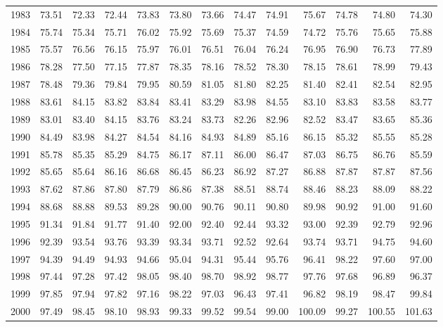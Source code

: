 \begin{longtable}{rrrrrrrrrrrrr}
  1983 & 73.51 & 72.33 & 72.44 & 73.83 & 73.80 & 73.66 & 74.47 & 74.91 & 75.67 & 74.78 & 74.80 & 74.30 \\ 
  1984 & 75.74 & 75.34 & 75.71 & 76.02 & 75.92 & 75.69 & 75.37 & 74.59 & 74.72 & 75.76 & 75.65 & 75.88 \\ 
  1985 & 75.57 & 76.56 & 76.15 & 75.97 & 76.01 & 76.51 & 76.04 & 76.24 & 76.95 & 76.90 & 76.73 & 77.89 \\ 
  1986 & 78.28 & 77.50 & 77.15 & 77.87 & 78.35 & 78.16 & 78.52 & 78.30 & 78.15 & 78.61 & 78.99 & 79.43 \\ 
  1987 & 78.48 & 79.36 & 79.84 & 79.95 & 80.59 & 81.05 & 81.80 & 82.25 & 81.40 & 82.41 & 82.54 & 82.95 \\ 
  1988 & 83.61 & 84.15 & 83.82 & 83.84 & 83.41 & 83.29 & 83.98 & 84.55 & 83.10 & 83.83 & 83.58 & 83.77 \\ 
  1989 & 83.01 & 83.40 & 84.15 & 83.76 & 83.24 & 83.73 & 82.26 & 82.96 & 82.52 & 83.47 & 83.65 & 85.36 \\ 
  1990 & 84.49 & 83.98 & 84.27 & 84.54 & 84.16 & 84.93 & 84.89 & 85.16 & 86.15 & 85.32 & 85.55 & 85.28 \\ 
  1991 & 85.78 & 85.35 & 85.29 & 84.75 & 86.17 & 87.11 & 86.00 & 86.47 & 87.03 & 86.75 & 86.76 & 85.59 \\ 
  1992 & 85.65 & 85.64 & 86.16 & 86.68 & 86.45 & 86.23 & 86.92 & 87.27 & 86.88 & 87.87 & 87.87 & 87.56 \\ 
  1993 & 87.62 & 87.86 & 87.80 & 87.79 & 86.86 & 87.38 & 88.51 & 88.74 & 88.46 & 88.23 & 88.09 & 88.22 \\ 
  1994 & 88.68 & 88.88 & 89.53 & 89.28 & 90.00 & 90.76 & 90.11 & 90.80 & 89.98 & 90.92 & 91.00 & 91.60 \\ 
  1995 & 91.34 & 91.84 & 91.77 & 91.40 & 92.00 & 92.40 & 92.44 & 93.32 & 93.00 & 92.39 & 92.79 & 92.96 \\ 
  1996 & 92.39 & 93.54 & 93.76 & 93.39 & 93.34 & 93.71 & 92.52 & 92.64 & 93.74 & 93.71 & 94.75 & 94.60 \\ 
  1997 & 94.39 & 94.49 & 94.93 & 94.66 & 95.04 & 94.31 & 95.44 & 95.76 & 96.41 & 98.22 & 97.60 & 97.00 \\ 
  1998 & 97.44 & 97.28 & 97.42 & 98.05 & 98.40 & 98.70 & 98.92 & 98.77 & 97.76 & 97.68 & 96.89 & 96.37 \\ 
  1999 & 97.85 & 97.94 & 97.82 & 97.16 & 98.22 & 97.03 & 96.43 & 97.41 & 96.82 & 98.19 & 98.47 & 99.84 \\ 
  2000 & 97.49 & 98.45 & 98.10 & 98.93 & 99.33 & 99.52 & 99.54 & 99.00 & 100.09 & 99.27 & 100.55 & 101.63 \\ 

\end{longtable}
